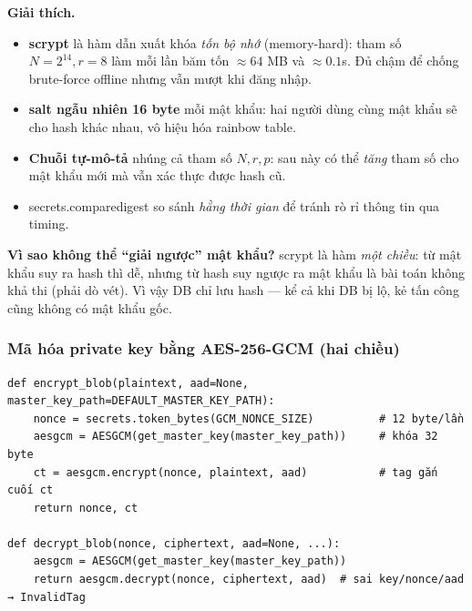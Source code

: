 \documentclass[12pt,a4paper]{article}
\newcommand{\code}[1]{{\ttfamily\small\def\_{\textunderscore\discretionary{}{}{}}#1}}
\begin{document}
\textbf{Giải thích.}
\begin{itemize}
  \item \textbf{scrypt} là hàm dẫn xuất khóa \emph{tốn bộ nhớ} (memory-hard):
        tham số $N=2^{14}, r=8$ làm mỗi lần băm tốn $\approx 64$ MB và $\approx
        0.1$s. Đủ chậm để chống brute-force offline nhưng vẫn mượt khi đăng nhập.
  \item \textbf{salt ngẫu nhiên 16 byte} mỗi mật khẩu: hai người dùng cùng mật
        khẩu sẽ cho hash khác nhau, vô hiệu hóa rainbow table.
  \item \textbf{Chuỗi tự-mô-tả} nhúng cả tham số $N,r,p$: sau này có thể \emph{tăng}
        tham số cho mật khẩu mới mà vẫn xác thực được hash cũ.
  \item \code{secrets.compare\_digest} so sánh \emph{hằng thời gian} để tránh rò
        rỉ thông tin qua timing.
\end{itemize}

\begin{warnbox}
\textbf{Vì sao không thể ``giải ngược'' mật khẩu?} scrypt là hàm \emph{một chiều}:
từ mật khẩu suy ra hash thì dễ, nhưng từ hash suy ngược ra mật khẩu là bài toán
không khả thi (phải dò vét). Vì vậy DB chỉ lưu hash — kể cả khi DB bị lộ, kẻ tấn
công cũng không có mật khẩu gốc.
\end{warnbox}

\subsubsection{Mã hóa private key bằng AES-256-GCM (hai chiều)}

\begin{Verbatim}
def encrypt_blob(plaintext, aad=None, master_key_path=DEFAULT_MASTER_KEY_PATH):
    nonce = secrets.token_bytes(GCM_NONCE_SIZE)          # 12 byte/lần
    aesgcm = AESGCM(get_master_key(master_key_path))     # khóa 32 byte
    ct = aesgcm.encrypt(nonce, plaintext, aad)           # tag gắn cuối ct
    return nonce, ct

def decrypt_blob(nonce, ciphertext, aad=None, ...):
    aesgcm = AESGCM(get_master_key(master_key_path))
    return aesgcm.decrypt(nonce, ciphertext, aad)  # sai key/nonce/aad → InvalidTag
\end{Verbatim}
\end{document}
